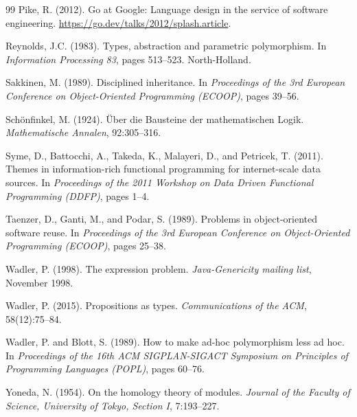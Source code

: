 \documentclass[11pt,a4paper]{article}
\begin{document}
\begin{thebibliography}{99}
Pike, R. (2012).
\newblock Go at Google: Language design in the service of software engineering.
\newblock \url{https://go.dev/talks/2012/splash.article}.

Reynolds, J.C. (1983).
\newblock Types, abstraction and parametric polymorphism.
\newblock In \emph{Information Processing 83}, pages 513--523. North-Holland.

Sakkinen, M. (1989).
\newblock Disciplined inheritance.
\newblock In \emph{Proceedings of the 3rd European Conference on Object-Oriented Programming (ECOOP)}, pages 39--56.

Sch\"{o}nfinkel, M. (1924).
\newblock \"{U}ber die Bausteine der mathematischen Logik.
\newblock \emph{Mathematische Annalen}, 92:305--316.

Syme, D., Battocchi, A., Takeda, K., Malayeri, D., and Petricek, T. (2011).
\newblock Themes in information-rich functional programming for internet-scale data sources.
\newblock In \emph{Proceedings of the 2011 Workshop on Data Driven Functional Programming (DDFP)}, pages 1--4.

Taenzer, D., Ganti, M., and Podar, S. (1989).
\newblock Problems in object-oriented software reuse.
\newblock In \emph{Proceedings of the 3rd European Conference on Object-Oriented Programming (ECOOP)}, pages 25--38.

Wadler, P. (1998).
\newblock The expression problem.
\newblock \emph{Java-Genericity mailing list}, November 1998.

Wadler, P. (2015).
\newblock Propositions as types.
\newblock \emph{Communications of the ACM}, 58(12):75--84.

Wadler, P. and Blott, S. (1989).
\newblock How to make ad-hoc polymorphism less ad hoc.
\newblock In \emph{Proceedings of the 16th ACM SIGPLAN-SIGACT Symposium on Principles of Programming Languages (POPL)}, pages 60--76.

Yoneda, N. (1954).
\newblock On the homology theory of modules.
\newblock \emph{Journal of the Faculty of Science, University of Tokyo, Section I}, 7:193--227.

\end{thebibliography}
\end{document}
